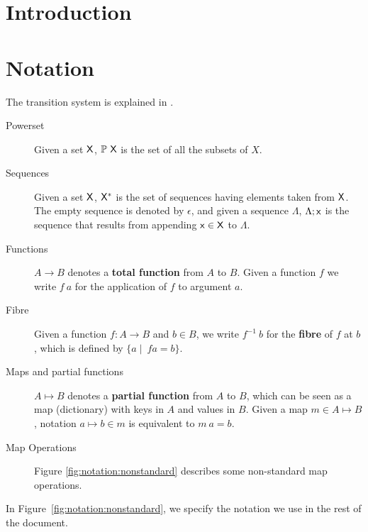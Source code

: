 \documentclass[11pt,a4paper]{article}
\theoremstyle{definition}
\theoremstyle{definition}
\begin{document}


\tableofcontents
\listoffigures

\section{Introduction}
\label{sec:introduction}


\section{Notation}\label{sec:notation}

The transition system is explained in \cite{small_step_semantics}.

\begin{description}
\item[Powerset] Given a set $\mathsf{X}$, $\mathbb{P}~\mathsf{X}$ is the set of all
  the subsets of $X$.
\item[Sequences] Given a set $\mathsf{X}$, $\mathsf{X}^{*}$ is the set of
  sequences having elements taken from $\mathsf{X}$. The empty sequence is
  denoted by $\epsilon$, and given a sequence $\Lambda$, $\Lambda; \mathsf{x}$ is
  the sequence that results from appending $\mathsf{x} \in \mathsf{X}$ to
  $\Lambda$.
\item[Functions] $A \to B$ denotes a \textbf{total function} from $A$ to $B$.
  Given a function $f$ we write $f~a$ for the application of $f$ to argument
  $a$.
\item[Fibre] Given a function $f: A \to B$ and $b\in B$, we write
  $f^{-1}~b$ for the \textbf{fibre} of $f$ at $b$, which is defined by
  $\{a \mid\ f a =  b\}$.
\item[Maps and partial functions] $A \mapsto B$ denotes a \textbf{partial
    function} from $A$ to $B$, which can be seen as a map (dictionary) with
  keys in $A$ and values in $B$. Given a map $m \in A \mapsto B$, notation
  $a \mapsto b \in m$ is equivalent to $m~ a = b$.
\item[Map Operations] Figure \ref{fig:notation:nonstandard}
  describes some non-standard map operations.

\end{description}

In Figure~\ref{fig:notation:nonstandard}, we specify the notation we use in
the rest of the document.
\end{document}
